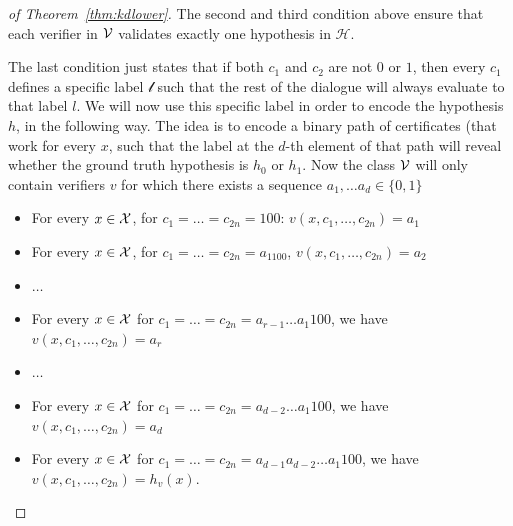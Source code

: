 \documentclass[anon]{alt2027} %
\begin{document}
\begin{proof}[of Theorem~\ref{thm:kdlower}]
    The second and third condition above ensure that each verifier in ${\mathcal V}$ validates exactly one hypothesis in $\mathcal{H}$.
    
    The last condition just states that if both $c_1$ and $c_2$ are not $0$ or $1$, then every $c_1$ defines a specific label $\mathcal{l}$ such that the rest of the dialogue will always evaluate to that label $l$.
    We will now use this specific label in order to encode the hypothesis $h$, in the following way.
    The idea is to encode a binary path of certificates (that work for every $x$, such that the label at the $d$-th element of that path will reveal whether the ground truth hypothesis is $h_0$ or $h_1$.
    Now the class ${\mathcal V}$ will only contain verifiers $v$ for which there exists a sequence $a_1, \dots a_d \in \{0,1\}$
    \begin{itemize}
        \item For every $x\in {\mathcal X}$, for $c_1 = \dots =c_{2n} = 100$: $v(x, c_1, \dots, c_{2n}) = a_1$
        \item For every $x\in {\mathcal X}$, for $c_1 = \dots =c_{2n} = a_1100$, $v(x, c_1, \dots, c_{2n}) = a_2$
        \item $\dots$
        \item For every $x \in {\mathcal X}$ for $c_1 = \dots = c_{2n} = a_{r-1} \dots a_1 1 00$, we have $v(x, c_1, \dots, c_{2n}) = a_r$
        \item $\dots$
        \item For every $x \in {\mathcal X}$ for $c_1 = \dots = c_{2n} = a_{d-2} \dots a_1 1 00$, we have $v(x, c_1, \dots, c_{2n}) = a_d$
        \item For every $x \in {\mathcal X}$ for $c_1 = \dots = c_{2n} = a_{d-1} a_{d-2} \dots a_1 1 00$, we have $v(x, c_1, \dots, c_{2n}) = h_v(x)$.
    \end{itemize}

\end{proof}
\end{document}
